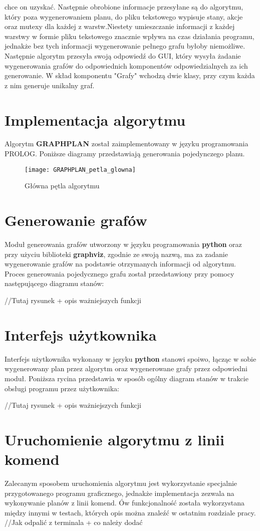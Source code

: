     chce on uzyskać. Następnie obrobione informacje przesyłane są do algorytmu, który poza wygenerowaniem planu, do pliku tekstowego wypisuje 
    stany, akcje oraz mutexy dla każdej z warstw.Niestety umieszczanie informacji z każdej warstwy w formie pliku tekstowego 
    znacznie wpływa na czas działania programu, jednakże bez tych informacji wygenerowanie pełnego grafu byłoby niemożliwe. 
    Następnie algorytm przesyła swoją odpowiedź do GUI, który wysyła żadanie wygenerowania grafów do odpowiednich komponentów odpowiedzialnych za ich 
    generowanie. W skład komponentu "Grafy" wchodzą dwie klasy, przy czym każda z nim generuje unikalny graf.

\section{Implementacja algorytmu}
    Algorytm \textbf{GRAPHPLAN} został zaimplementowany w języku programowania PROLOG. Poniższe diagramy przedstawiają  
    generowania pojedynczego planu.
    \begin{figure}[H]
        \texttt{[image: GRAPHPLAN\_petla\_glowna]}
        \centering
        \caption{Główna pętla algorytmu}
    \end{figure}

    

\section{Generowanie grafów}
    Moduł generowania grafów utworzony w języku programowania \textbf{python} oraz przy użyciu biblioteki \textbf{graphviz}, zgodnie ze swoją nazwą,
    ma za zadanie wygenerowanie grafów na podstawie otrzymanych informacji od algorytmu. Proces generowania pojedycznego grafu został przedstawiony 
    przy pomocy następującego diagramu stanów:

    //Tutaj rysunek + opis ważniejszych funkcji

\section{Interfejs użytkownika}
    Interfejs użytkownika wykonany w języku \textbf{python} stanowi spoiwo, łącząc w sobie wygenerowany plan przez algorytm oraz wygenerowane grafy przez 
    odpowiedni moduł. Poniższa rycina przedstawia w sposób ogólny diagram stanów w trakcie obsługi programu przez użytkownika:

    //Tutaj rysunek + opis ważniejszych funkcji


\section{Uruchomienie algorytmu z linii komend}
    \label{CommandLine}
    Zalecanym sposobem uruchomienia algorytmu jest wykorzystanie specjalnie przygotowanego programu graficznego, jednakże implementacja zezwala na 
    wykonywanie planów z linii komend. Ów funkcjonalność została wykorzystana między innymi w testach, których opis można znaleźć w ostatnim rozdziale pracy.
    //Jak odpalić z terminala + co należy dodać
